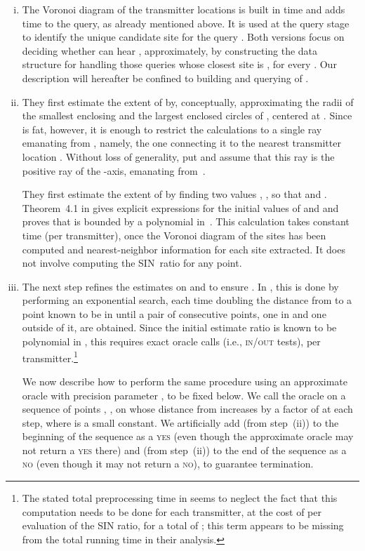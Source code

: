 \documentclass[11pt]{article}
\theoremstyle{remark}
\begin{document}
\begin{enumerate}[(i)]
\item The Voronoi diagram of the transmitter locations is built in  time and adds  time to the query, as already mentioned above.
It is used at the query stage to identify the unique candidate site  for the query .  Both versions focus on deciding whether  can hear , approximately, by constructing the data structure  for handling those queries whose closest site is , for every .  Our description will  hereafter be confined to building and querying of .


\item They first estimate the extent of  by, conceptually, approximating the radii of the smallest enclosing and the largest enclosed circles of , centered at .  Since  is fat, however, it is enough to restrict the calculations to a single ray emanating from , namely, the one connecting it to the nearest transmitter location .  Without loss of generality, put  and assume that this ray is the positive ray of the -axis, emanating from~.  

They first estimate the extent of  by finding two values , , so that  and .  Theorem~4.1 in \cite{aeklpr-sdciawn-12} gives explicit expressions for the initial values of  and  and proves that  is bounded by a polynomial in~.  This calculation takes constant time (per transmitter), once the Voronoi diagram of the sites has been computed and nearest-neighbor information for each site extracted.  It does not involve computing the SIN~ratio for any point.

\item The next step refines the estimates on  and  to ensure .
In \cite{aeklpr-sdciawn-12}, this is done  by performing an exponential search, each time doubling the distance from  to a point known to be in  until a pair of consecutive points, one in  and one outside of it, are obtained.  Since the initial estimate ratio is known to be polynomial in , this requires  exact oracle calls (i.e., \textsc{in/out} tests), per transmitter.\footnote{The stated total preprocessing time in \cite{aeklpr-sdciawn-12} seems to neglect the fact that this computation needs to be done for each transmitter, at the cost of  per evaluation of the SIN ratio, for a total of ; this term appears to be missing from the total running time in their analysis.}



We now describe how to perform the same procedure using an approximate oracle with precision parameter , to be fixed below.
We call the oracle on a sequence of points , , on  whose distance from  increases by a factor of  at each step, where  is a small constant. We artificially add  (from step~(ii)) to the beginning of the sequence as a \textsc{yes} (even though the approximate oracle may not return a \textsc{yes} there) and  (from step~(ii)) to the end of the sequence as a \textsc{no} (even though it may not return a \textsc{no}), to guarantee termination.


\end{enumerate}
\end{document}
